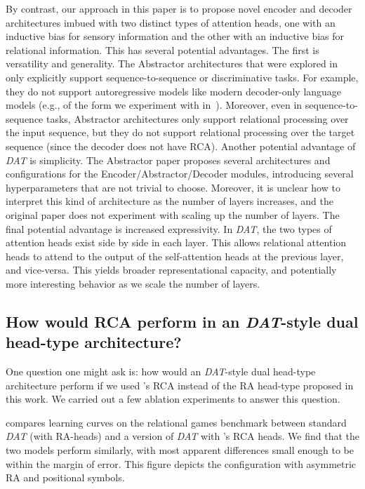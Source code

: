 By contrast, our approach in this paper is to propose novel encoder and decoder architectures imbued with two distinct types of attention heads, one with an inductive bias for sensory information and the other with an inductive bias for relational information. This has several potential advantages. The first is versatility and generality. The Abstractor architectures that were explored in~\citep{altabaa2024abstractors} only explicitly support sequence-to-sequence or discriminative tasks. For example, they do not support autoregressive models like modern decoder-only language models (e.g., of the form we experiment with in~). Moreover, even in sequence-to-sequence tasks, Abstractor architectures only support relational processing over the input sequence, but they do not support relational processing over the target sequence (since the decoder does not have RCA). Another potential advantage of \textit{DAT} is simplicity. The Abstractor paper proposes several architectures and configurations for the Encoder/Abstractor/Decoder modules, introducing several hyperparameters that are not trivial to choose. Moreover, it is unclear how to interpret this kind of architecture as the number of layers increases, and the original paper does not experiment with scaling up the number of layers. The final potential advantage is increased expressivity. In \textit{DAT}, the two types of attention heads exist side by side in each layer. This allows relational attention heads to attend to the output of the self-attention heads at the previous layer, and vice-versa. This yields broader representational capacity, and potentially more interesting behavior as we scale the number of layers.

\subsection{How would RCA perform in an \textit{DAT}-style dual head-type architecture?}

One question one might ask is: how would an \textit{DAT}-style dual head-type architecture perform if we used \citet{altabaa2024abstractors}'s RCA instead of the RA head-type proposed in this work. We carried out a few ablation experiments to answer this question.

 compares learning curves on the relational games benchmark between standard \textit{DAT} (with RA-heads) and a version of \textit{DAT} with \citet{altabaa2024abstractors}'s RCA heads. We find that the two models perform similarly, with most apparent differences small enough to be within the margin of error. This figure depicts the configuration with asymmetric RA and positional symbols.

